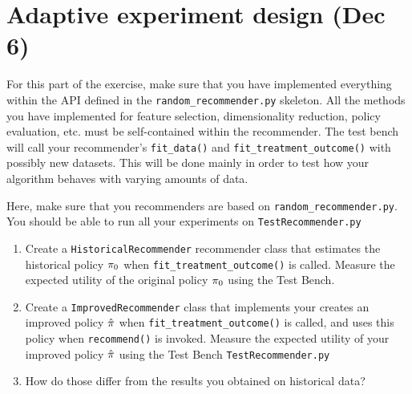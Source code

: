 \section{Adaptive experiment design (Dec 6)}
For this part of the exercise, make sure that you have implemented everything within the API defined in the \verb!random_recommender.py! skeleton. All the methods you have implemented for feature selection, dimensionality reduction, policy evaluation, etc. must be self-contained within the recommender. The test bench will call your recommender's \verb!fit_data()! and \verb!fit_treatment_outcome()! with possibly new datasets. This will be done mainly in order to test how your algorithm behaves with varying amounts of data.
\begin{exercise}
  Here, make sure that you recommenders are based on \verb!random_recommender.py!.
  You should be able to run all your experiments on \verb!TestRecommender.py!
  \begin{enumerate}
  \item Create a \texttt{HistoricalRecommender} recommender class that estimates the historical policy $\pi_0$ when \verb!fit_treatment_outcome()! is called. Measure the expected utility of the original policy $\pi_0$ using the Test Bench.
  \item Create a \texttt{ImprovedRecommender} class that implements your creates an improved policy $\hat{\pi}$ when \verb!fit_treatment_outcome()! is called, and uses this policy when \verb!recommend()! is invoked. Measure the expected utility of your improved policy $\hat{\pi}$ using the Test Bench \verb!TestRecommender.py!
  \item How do those differ from the results you obtained on historical data?
  \end{enumerate}
\end{exercise}

